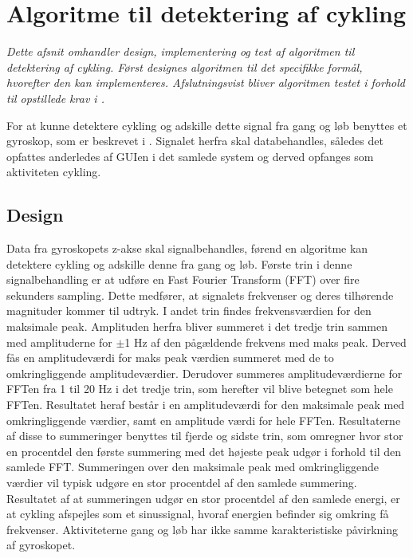 \section{Algoritme til detektering af cykling}
\textit{Dette afsnit omhandler design, implementering og test af algoritmen til detektering af cykling. Først designes algoritmen til det specifikke formål, hvorefter den kan implementeres. Afslutningsvist bliver algoritmen testet i forhold til opstillede krav i .} 

For at kunne detektere cykling og adskille dette signal fra gang og løb benyttes et gyroskop, som er beskrevet i . Signalet herfra skal databehandles, således det opfattes anderledes af GUIen i det samlede system og derved opfanges som aktiviteten cykling. 

\subsection{Design}\label{design_cykling}
Data fra gyroskopets z-akse skal signalbehandles, førend en algoritme kan detektere cykling og adskille denne fra gang og løb. Første trin i denne signalbehandling er at udføre en Fast Fourier Transform (FFT) over fire sekunders sampling. Dette medfører, at signalets frekvenser og deres tilhørende magnituder kommer til udtryk. I andet trin findes frekvensværdien for den maksimale peak. Amplituden herfra bliver summeret i det tredje trin sammen med amplituderne for $\pm$1 Hz af den pågældende frekvens med maks peak. Derved fås en amplitudeværdi for maks peak værdien summeret med de to omkringliggende amplitudeværdier. Derudover summeres amplitudeværdierne for FFTen fra 1 til 20 Hz i det tredje trin, som herefter vil blive betegnet som hele FFTen. Resultatet heraf består i en amplitudeværdi for den maksimale peak med omkringliggende værdier, samt en amplitude værdi for hele FFTen. Resultaterne af disse to summeringer benyttes til fjerde og sidste trin, som omregner hvor stor en procentdel den første summering med det højeste peak udgør i forhold til den samlede FFT. Summeringen over den maksimale peak med omkringliggende værdier vil typisk udgøre en stor procentdel af den samlede summering. Resultatet af at summeringen udgør en stor procentdel af den samlede energi, er at cykling afspejles som et sinussignal, hvoraf energien befinder sig omkring få frekvenser. Aktiviteterne gang og løb har ikke samme karakteristiske påvirkning af gyroskopet.
